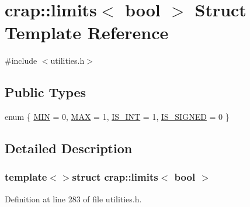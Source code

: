 \hypertarget{structcrap_1_1limits_3_01bool_01_4}{\section{crap\+:\+:limits$<$ bool $>$ Struct Template Reference}
\label{structcrap_1_1limits_3_01bool_01_4}
}


{\ttfamily \#include $<$utilities.\+h$>$}

\subsection*{Public Types}
\begin{DoxyCompactItemize}
\item 
enum \{ \hyperlink{structcrap_1_1limits_3_01bool_01_4_a6dfac54fc5fc870a22f8f7b60b30109fa9a55bfd482f1eb8c71b02333050b7562}{M\+I\+N} = 0, 
\hyperlink{structcrap_1_1limits_3_01bool_01_4_a6dfac54fc5fc870a22f8f7b60b30109fa6b42ad4f43c39965b3511bba1dd28617}{M\+A\+X} = 1, 
\hyperlink{structcrap_1_1limits_3_01bool_01_4_a6dfac54fc5fc870a22f8f7b60b30109fa2de281e498030a18240f61dc484ec205}{I\+S\+\_\+\+I\+N\+T} = 1, 
\hyperlink{structcrap_1_1limits_3_01bool_01_4_a6dfac54fc5fc870a22f8f7b60b30109fa47976b05af95957aa2d4187566f277fa}{I\+S\+\_\+\+S\+I\+G\+N\+E\+D} = 0
 \}
\end{DoxyCompactItemize}


\subsection{Detailed Description}
\subsubsection*{template$<$$>$struct crap\+::limits$<$ bool $>$}



Definition at line 283 of file utilities.\+h.



